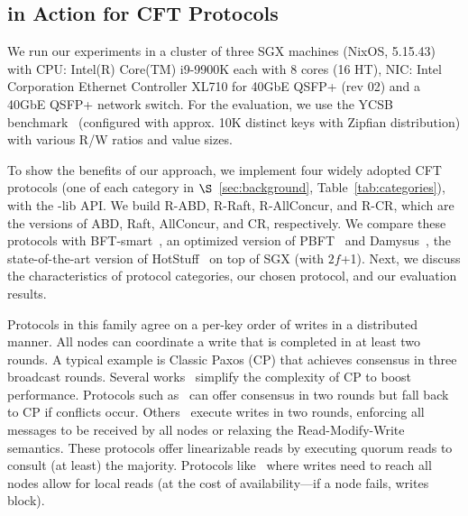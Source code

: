 \subsection{\projecttitle{} in Action for CFT Protocols}

We run our experiments in a cluster of three SGX machines (NixOS, 5.15.43) with CPU: Intel(R) Core(TM) i9-9900K each with 8 cores (16 HT), NIC: Intel Corporation Ethernet Controller XL710 for 40GbE QSFP+ (rev 02) and a 40GbE QSFP+ network switch. For the evaluation, we use the YCSB benchmark~\cite{YCSB} (configured with approx. 10K distinct keys with Zipfian distribution) with various R/W ratios and value sizes. 


To show the benefits of our approach, we implement four widely adopted CFT protocols (one of each category in $\S$~\ref{sec:background}, Table~\ref{tab:categories}), with the \projecttitle{}-lib API. We build R-ABD, R-Raft, R-AllConcur, and R-CR, which are the \projecttitle{} versions of ABD, Raft, AllConcur, and CR, respectively. We compare these protocols with BFT-smart~\cite{bft-smart}, an optimized version of PBFT~\cite{Castro:2002} and Damysus~\cite{10.1145/3492321.3519568}, the state-of-the-art version of HotStuff~\cite{DBLP:journals/corr/abs-1803-05069} on top of SGX (with $2f$+1). Next, we discuss the characteristics of protocol categories, our chosen protocol, and our evaluation results.

Protocols in this family agree on a per-key order of writes in a distributed manner. All nodes can coordinate a write that is completed in at least two rounds. A typical example is Classic Paxos (CP) that achieves consensus in three broadcast rounds.  Several works~\cite{10.1145/2517349.2517350, https://doi.org/10.48550/arxiv.2003.11789, phdthesis, Hermes:2020, lynch:1997} simplify the complexity of CP to boost performance. Protocols such as~\cite{10.1145/2517349.2517350, https://doi.org/10.48550/arxiv.2003.11789, phdthesis} can offer consensus in two rounds but fall back to CP if conflicts occur. Others~\cite{Hermes:2020, lynch:1997} execute writes in two rounds, enforcing all messages to be received by all nodes or relaxing the Read-Modify-Write semantics. These protocols offer linearizable reads by executing quorum reads to consult (at least) the majority. Protocols like~\cite{Hermes:2020} where writes need to reach all nodes allow for local reads (at the cost of availability---if a node fails, writes block).


